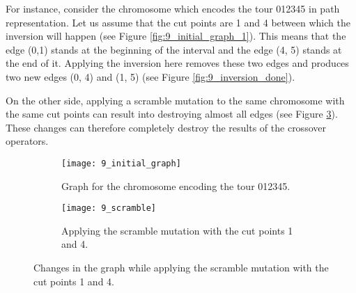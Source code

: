  For instance, consider the chromosome which encodes the tour 012345 in path representation. Let us assume that the cut points are 1 and 4 between which the inversion will happen (see Figure \ref{fig:9_initial_graph_1}). This means that the edge (0,1) stands at the beginning of the interval and the edge (4, 5) stands at the end of it. Applying the inversion here removes these two edges and produces two new edges (0, 4) and (1, 5) (see Figure \ref{fig:9_inversion_done}). \par 

\vspace{2cm}

On the other side, applying a scramble mutation to the same chromosome with the same cut points can result into destroying almost all edges (see Figure \ref{fig:9_scramble_changes_graph}). These changes can therefore completely destroy the results of the crossover operators.\par 


\begin{figure}[htp] \centering
	\begin{subfigure}[t]{0.45\textwidth}
		\texttt{[image: 9\_initial\_graph]}
		\caption{Graph for the chromosome encoding the tour 012345.}
		\label{fig:9_initial_graph_2}
	\end{subfigure}
	\hfill
	\begin{subfigure}[t]{0.45\textwidth}
		\centering
		\texttt{[image: 9\_scramble]}
		\caption{Applying the scramble mutation with the cut points 1 and 4.}
		\label{fig:9_scramble}
	\end{subfigure}	
	\caption{Changes in the graph while applying the scramble mutation with the cut points 1 and 4.}
	\label{fig:9_scramble_changes_graph}
\end{figure}




 